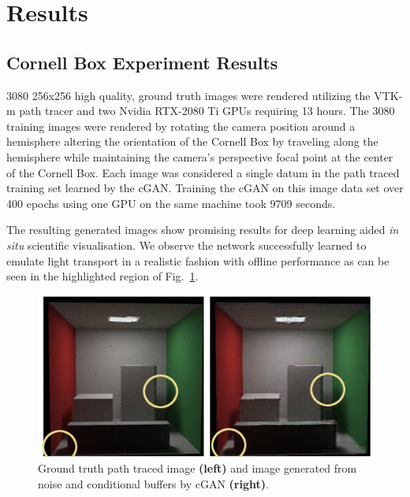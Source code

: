 
\section{Results}
\subsection{Cornell Box Experiment Results}
3080 256x256 high quality, ground truth images were rendered utilizing the VTK-m path tracer and two Nvidia RTX-2080 Ti GPUs requiring 13 hours. The 3080 training images were rendered by rotating the camera position around a hemisphere altering the orientation of the Cornell Box by traveling along the hemisphere while maintaining the camera's perspective focal point at the center of the Cornell Box. Each image was considered a single datum in the path traced training set learned by the cGAN. Training the cGAN on this image data set over 400 epochs using one GPU on the same machine took 9709 seconds. %

The resulting generated images show promising results for deep learning aided \textit{in situ} scientific visualisation. We observe the network successfully learned to emulate light transport in a realistic fashion with offline performance as can be seen in the highlighted region of Fig.~\ref{fig:lighttransport}.

\begin{figure}
    \includegraphics[width=\linewidth]{genDemo.png}
    \caption{Ground truth path traced image \textbf{(left)} and image generated from noise and conditional buffers by cGAN \textbf{(right)}.}
    \label{fig:lighttransport}
\end{figure}

